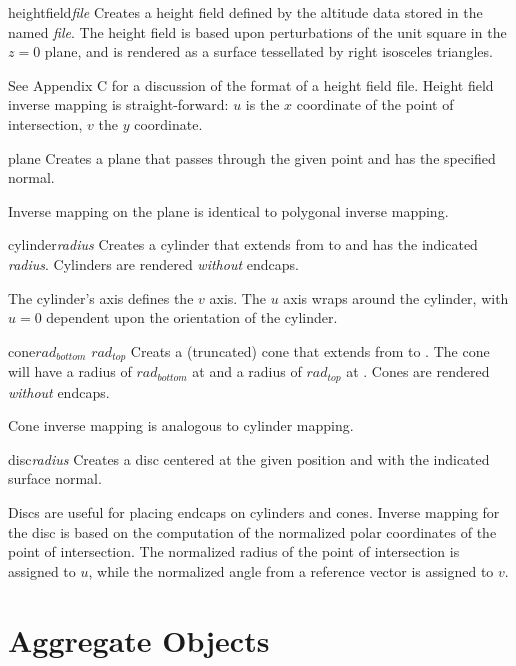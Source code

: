 \begin{defprim}{heightfield}{{\em file}}
	Creates a height field defined by the altitude data stored
	in the named {\em file}.  The height field is based upon
	perturbations of the unit square in the $z=0$ plane, and is
	rendered as a surface tessellated by right isosceles triangles.
\end{defprim}
See Appendix C for a discussion of the format of a height field file.
Height field inverse mapping is straight-forward:  $u$ is the
$x$ coordinate of the point of intersection, $v$ the $y$ coordinate.

\begin{defprim}{plane}{ }
	Creates a plane that passes through the given point and
	has the specified normal.
\end{defprim}
Inverse mapping on the plane is identical to polygonal inverse mapping.

\begin{defprim}{cylinder}{{\em radius}  }
	Creates a cylinder that extends from  to 
	and has the indicated {\em radius}.  Cylinders are rendered
	{\em without} endcaps.
\end{defprim}
The cylinder's axis defines the $v$ axis.  The $u$ axis wraps around the
cylinder, with $u=0$ dependent upon the orientation of the cylinder.


\begin{defprim}{cone}{$rad_{bottom}$  $rad_{top}$ }
	Creats a (truncated) cone that extends from  to
	.  The cone will have a radius of $rad_{bottom}$ at
	 and a radius of $rad_{top}$ at .
	Cones are rendered {\em without} endcaps.
\end{defprim}
Cone inverse mapping is analogous to cylinder mapping.

\begin{defprim}{disc}{{\em radius}  }
	Creates a disc centered at the given position and with the
	indicated surface normal.
\end{defprim}
Discs are useful for placing
endcaps on cylinders and cones.
Inverse mapping for the disc is based on the computation of the
normalized polar coordinates of the point of intersection.  The
normalized radius
of the point of intersection is assigned to $u$, while the normalized angle
from a reference vector is assigned to $v$.

\section{Aggregate Objects}

